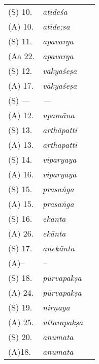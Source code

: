 \begin{table}[h]
\begin{longtable}{m{1cm} m{2cm} p{4cm}}
	\rule{0pt}{0.5cm}(S) 10. & \textit{atideśa} & \dev{/} \\
	(A) 10. & \textit{atide;sa} & \dev{/} \\
	
	\rule{0pt}{0.5cm}(S) 11. & \textit{apavarga} & \dev{/} \\
	(Aa 22. & \textit{apavarga} & \dev{/} \\
	
	\rule{0pt}{0.5cm}(S) 12. & \textit{vākyaśeṣa} & \dev{/} \\
	(A) 17. & \textit{vākyaśeṣa} & \dev{/} \\
	
	\rule{0pt}{0.5cm}(S) --- & \textit{---} & \dev{---/} \\
	(A) 12. & \textit{upamāna} & \dev{/} \\
	
	\rule{0pt}{0.5cm}(S) 13. & \textit{arthāpatti} & \dev{/} \\
	(A) 13. & \textit{arthāpatti} & \dev{/} \\
	
	\rule{0pt}{0.5cm}(S) 14. & \textit{viparyaya} & \dev{/} \\
	(A) 16. & \textit{viparyaya} & \dev{/} \\
	
	\rule{0pt}{0.5cm}(S) 15. & \textit{prasaṅga} & \dev{/} \\
	(A) 15. & \textit{prasaṅga} & \dev{/} \\
	
	\rule{0pt}{0.5cm}(S) 16. & \textit{ekānta} & \dev{/} \\
	(A) 26. & \textit{ekānta} & \dev{/} \\
	
	\rule{0pt}{0.5cm}(S) 17. & \textit{anekānta} & \dev{/} \\
	(A)-- & \textit{--} & \dev{--/} \\
	
	\rule{0pt}{0.5cm}(S) 18. & \textit{pūrvapakṣa} & \dev{/} \\
	(A) 24. & \textit{pūrvapakṣa} & \dev{/} \\
	
	\rule{0pt}{0.5cm}(S) 19. & \textit{nirṇaya} & \dev{/} \\
	(A) 25. & \textit{uttarapakṣa} & \dev{/} \\
	
	\rule{0pt}{0.5cm}(S) 20. & \textit{anumata} & \dev{/} \\
	(A)18. & \textit{anumata} & \dev{/} \\
	

\end{longtable}
\end{table}
